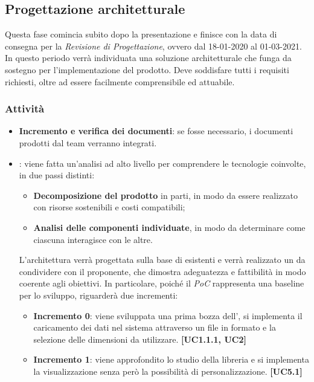 \subsection{Progettazione architetturale}
Questa fase comincia subito dopo la presentazione e finisce con la data di consegna per la \textit{Revisione di Progettazione}, ovvero dal 18-01-2020 al 01-03-2021.\\
In questo periodo verrà individuata una soluzione architetturale che funga da sostegno per l'implementazione del prodotto. Deve soddisfare tutti i requisiti richiesti, oltre ad essere facilmente comprensibile ed attuabile. 
\subsubsection{Attività}
\begin{itemize}
\item \textbf{Incremento e verifica dei documenti}: se fosse necessario, i documenti prodotti dal team verranno integrati.

 \item {}: viene fatta un'analisi ad alto livello per comprendere le tecnologie coinvolte, in due passi distinti:
\begin{itemize}
 \item \textbf{Decomposizione del prodotto} in parti, in modo da essere realizzato con risorse sostenibili e costi compatibili;
 \item \textbf{Analisi delle componenti individuate}, in modo da determinare come ciascuna interagisce con le altre.  
\end{itemize}
L'architettura verrà progettata sulla base di  esistenti e verrà realizzato un  da condividere con il proponente, che dimostra adeguatezza e fattibilità in modo coerente agli obiettivi. In particolare, poiché il \textit{PoC} rappresenta una baseline per lo sviluppo, riguarderà due incrementi:
\begin{itemize}
	\item \textbf{Incremento 0}: viene sviluppata una prima bozza dell', si implementa il caricamento dei dati nel sistema attraverso un file in formato  e la selezione delle dimensioni da utilizzare. \textbf{[UC1.1.1, UC2]}
	\item \textbf{Incremento 1}: viene approfondito lo studio della libreria  e si implementa la visualizzazione  senza però la possibilità di personalizzazione. \textbf{[UC5.1]}
\end{itemize} 

\end{itemize}

